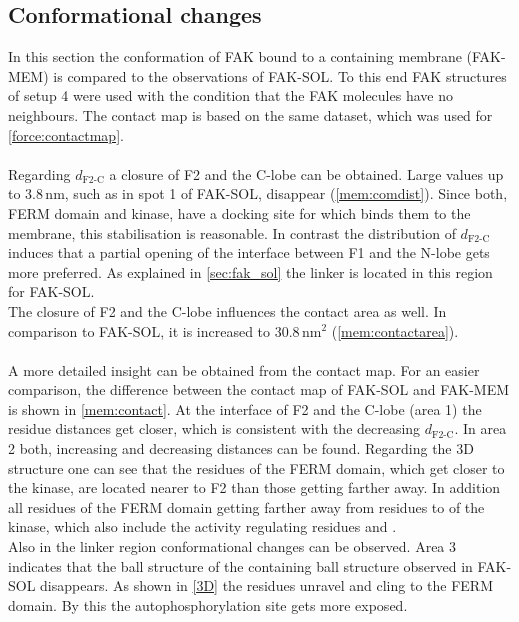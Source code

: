 \subsection{Conformational changes}
In this section the conformation of FAK bound to a \pip{} containing membrane (FAK-MEM) is compared to the observations of FAK-SOL. To this end FAK structures of setup 4 were used with the condition that the FAK molecules have no neighbours. The contact map is based on the same dataset, which was used for \autoref{force:contactmap}.\\
\\
Regarding $d_\text{F2-C}$ a closure of F2 and the C-lobe can be obtained. Large values up to $3.8\,\si{\nano\metre}$, such as in spot 1 of FAK-SOL, disappear (\autoref{mem:comdist}). Since both, FERM domain and kinase, have a docking site for \pip{} which binds them to the membrane, this stabilisation is reasonable. In contrast the distribution of $d_\text{F2-C}$ induces that a partial opening of the interface between F1 and the N-lobe gets more preferred. As explained in \autoref{sec:fak_sol} the linker is located in this region for FAK-SOL.\\
The closure of F2 and the C-lobe influences the contact area as well. In comparison to FAK-SOL, it is increased to $30.8\,\si{\nano\metre}^2$ (\autoref{mem:contactarea}).\\
\\
A more detailed insight can be obtained from the contact map. For an easier comparison, the difference between the contact map of FAK-SOL and FAK-MEM is shown in \autoref{mem:contact}. At the interface of F2 and the C-lobe (area 1) the residue distances get closer, which is consistent with the decreasing $d_\text{F2-C}$. In area 2 both, increasing and decreasing distances can be found. Regarding the 3D structure one can see that the residues of the FERM domain, which get closer to the kinase, are located nearer to F2 than those getting farther away. In addition all residues of the FERM domain getting farther away from residues  to  of the kinase, which also include the activity regulating residues  and .\\
Also in the linker region conformational changes can be observed. Area 3 indicates that the ball structure of the  containing ball structure observed in FAK-SOL disappears. As shown in \autoref{3D} the residues unravel and cling to the FERM domain. By this the autophosphorylation site  gets more exposed.\\
